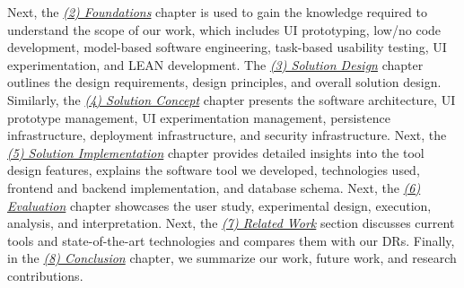 Next, the \textit{\hyperref[chap:foundations]{(2) Foundations}} chapter is used to gain the knowledge required to understand the scope of our work, which includes UI prototyping, low/no code development, model-based software engineering, task-based usability testing, UI experimentation, and LEAN development.
The \textit{\hyperref[chap:design]{(3) Solution Design}} chapter outlines the design requirements, design principles, and overall solution design. 
Similarly, the \textit{\hyperref[chap:concept]{(4) Solution Concept}} chapter presents the software architecture, UI prototype management, UI experimentation management, persistence infrastructure, deployment infrastructure, and security infrastructure.
Next, the \textit{\hyperref[chap:implementation]{(5) Solution Implementation}} chapter provides detailed insights into the tool design features, explains the software tool we developed, technologies used, frontend and backend implementation, and database schema. 
Next, the \textit{\hyperref[chap:evaluation]{(6) Evaluation}} chapter showcases the user study, experimental design, execution, analysis, and interpretation. 
Next, the \textit{\hyperref[chap:relatedWork]{(7) Related Work}} section discusses current tools and state-of-the-art technologies and compares them with our DRs.
Finally, in the \textit{\hyperref[chap:conclusion]{(8) Conclusion}} chapter, we summarize our work, future work, and research contributions.
